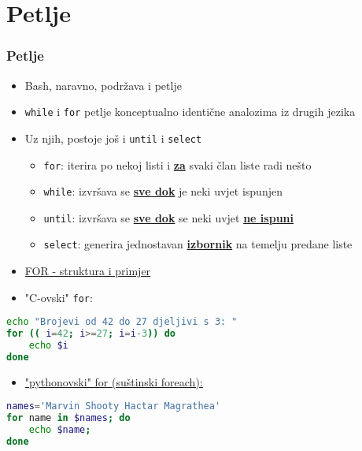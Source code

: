 \documentclass{beamer}
\newcommand{\shell}[1]{\texttt{#1}}
\begin{document}
\section{Petlje}
\begin{frame}
\frametitle{Petlje}
	\begin{itemize}
		\item Bash, naravno, podržava i petlje
		\item \shell{while} i \shell{for} petlje konceptualno identične analozima iz drugih jezika
		\item Uz njih, postoje još i \shell{until} i \shell{select}

		\begin{itemize}
			\item \shell{for}: iterira po nekoj listi i \underline{\textbf{za}} svaki član liste radi nešto
			\item \shell{while}: izvršava se \underline{\textbf{sve dok}} je neki uvjet ispunjen
			\item \shell{until}: izvršava se \underline{\textbf{sve dok}} se neki uvjet \underline{\textbf{ne ispuni}}
			\item \shell{select}: generira jednostavan \underline{\textbf{izbornik}} na temelju predane liste
		\end{itemize}
	\end{itemize}
\end{frame}

\begin{frame}[fragile]
	\begin{itemize}
		\item \underline{FOR - struktura i primjer}
		\item "C-ovski" \shell{for}:
	\end{itemize}
	\begin{lstlisting}[language=bash]
echo "Brojevi od 42 do 27 djeljivi s 3: "
for (( i=42; i>=27; i=i-3)) do
	echo $i
done
	\end{lstlisting}

	\begin{itemize}
		\item \underline{"pythonovski" for (suštinski foreach):}
	\end{itemize}
	\begin{lstlisting}[language=bash]
names='Marvin Shooty Hactar Magrathea'
for name in $names; do
	echo $name;
done
	\end{lstlisting}
\end{frame}
\end{document}
